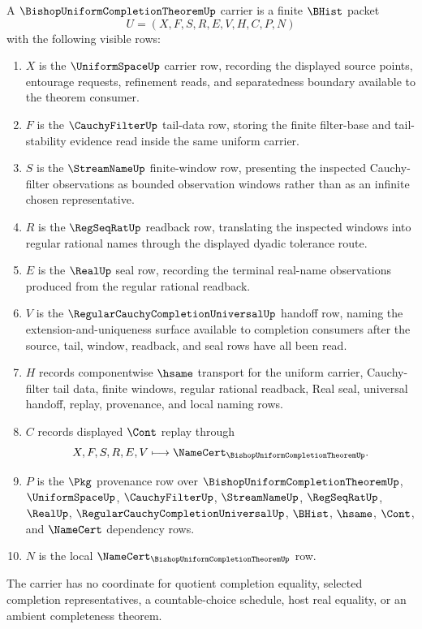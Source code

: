 \begin{definition}
\label{def:bishop-uniform-completion-theorem-carrier}
A $\BishopUniformCompletionTheoremUp$ carrier is a finite $\BHist$ packet
$$
U=(X,F,S,R,E,V,H,C,P,N)
$$
with the following visible rows:
\begin{enumerate}
\item $X$ is the $\UniformSpaceUp$ carrier row, recording the displayed source points, entourage requests, refinement reads, and separatedness boundary available to the theorem consumer.
\item $F$ is the $\CauchyFilterUp$ tail-data row, storing the finite filter-base and tail-stability evidence read inside the same uniform carrier.
\item $S$ is the $\StreamNameUp$ finite-window row, presenting the inspected Cauchy-filter observations as bounded observation windows rather than as an infinite chosen representative.
\item $R$ is the $\RegSeqRatUp$ readback row, translating the inspected windows into regular rational names through the displayed dyadic tolerance route.
\item $E$ is the $\RealUp$ seal row, recording the terminal real-name observations produced from the regular rational readback.
\item $V$ is the $\RegularCauchyCompletionUniversalUp$ handoff row, naming the extension-and-uniqueness surface available to completion consumers after the source, tail, window, readback, and seal rows have all been read.
\item $H$ records componentwise $\hsame$ transport for the uniform carrier, Cauchy-filter tail data, finite windows, regular rational readback, Real seal, universal handoff, replay, provenance, and local naming rows.
\item $C$ records displayed $\Cont$ replay through
$$
X,F,S,R,E,V \longmapsto \NameCert_{\BishopUniformCompletionTheoremUp}.
$$
\item $P$ is the $\Pkg$ provenance row over $\BishopUniformCompletionTheoremUp$, $\UniformSpaceUp$, $\CauchyFilterUp$, $\StreamNameUp$, $\RegSeqRatUp$, $\RealUp$, $\RegularCauchyCompletionUniversalUp$, $\BHist$, $\hsame$, $\Cont$, and $\NameCert$ dependency rows.
\item $N$ is the local $\NameCert_{\BishopUniformCompletionTheoremUp}$ row.
\end{enumerate}
The carrier has no coordinate for quotient completion equality, selected completion representatives, a countable-choice schedule, host real equality, or an ambient completeness theorem.
\end{definition}

